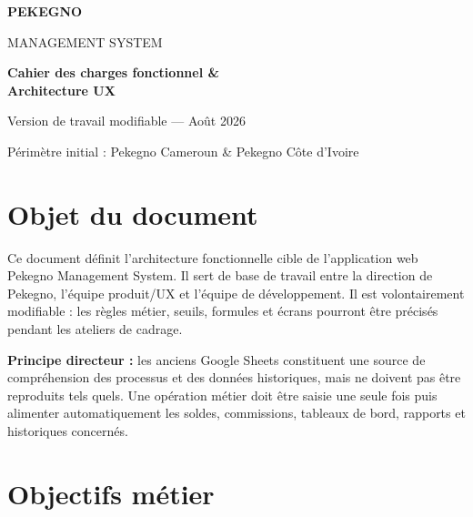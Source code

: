 \documentclass[11pt,a4paper]{article}
\begin{document}
\begin{titlepage}
  \centering
  \vspace*{3cm}
  {\Huge\bfseries PEKEGNO\par}
  \vspace{0.4cm}
  {\LARGE MANAGEMENT SYSTEM\par}
  \vspace{2cm}
  {\Large\bfseries Cahier des charges fonctionnel \&\\ Architecture UX\par}
  \vspace{2cm}
  {\large Version de travail modifiable --- Août 2026\par}
  \vspace{0.4cm}
  {\large Périmètre initial : Pekegno Cameroun \& Pekegno Côte d'Ivoire\par}
  \vfill
\end{titlepage}

\tableofcontents
\newpage

\section{Objet du document}

Ce document définit l'architecture fonctionnelle cible de l'application web Pekegno Management System. Il sert de base de travail entre la direction de Pekegno, l'équipe produit/UX et l'équipe de développement. Il est volontairement modifiable : les règles métier, seuils, formules et écrans pourront être précisés pendant les ateliers de cadrage.

\textbf{Principe directeur :} les anciens Google Sheets constituent une source de compréhension des processus et des données historiques, mais ne doivent pas être reproduits tels quels. Une opération métier doit être saisie une seule fois puis alimenter automatiquement les soldes, commissions, tableaux de bord, rapports et historiques concernés.

\section{Objectifs métier}
\end{document}
